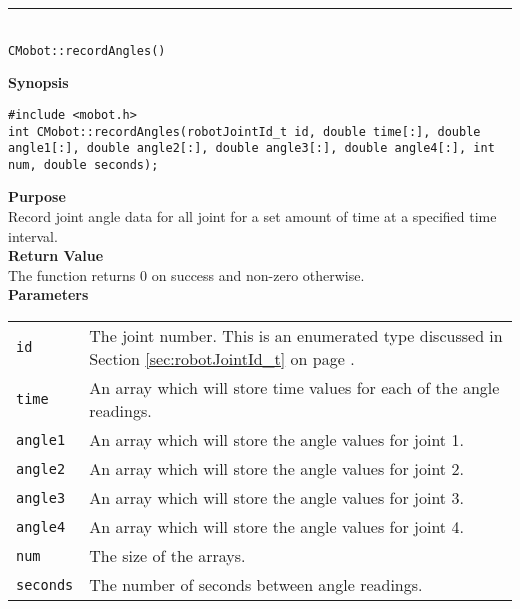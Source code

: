 \noindent
\vspace{5pt}
\rule{4.5in}{0.015in}\\
\noindent
{\LARGE \texttt{CMobot::recordAngles()}}\\
{}

\noindent
{\bf Synopsis}
\vspace{-8pt}
\begin{verbatim}
#include <mobot.h>
int CMobot::recordAngles(robotJointId_t id, double time[:], double angle1[:], double angle2[:], double angle3[:], double angle4[:], int num, double seconds);
\end{verbatim}

\noindent
{\bf Purpose}\\
Record joint angle data for all joint for a set amount of time at a specified time interval.\\

\noindent
{\bf Return Value}\\
The function returns 0 on success and non-zero otherwise.\\

\noindent
{\bf Parameters}\\
\vspace{-0.1in}
\begin{description}
\item               
\begin{tabular}{p{15 mm}p{145 mm}}
\texttt{id} & The joint number. This is an enumerated type 
discussed in Section \ref{sec:robotJointId_t} on page
\pageref{sec:robotJointId_t}.\\
\texttt{time} & An array which will store time values for each of the angle readings. \\
\texttt{angle1} & An array which will store the angle values for joint 1. \\
\texttt{angle2} & An array which will store the angle values for joint 2. \\
\texttt{angle3} & An array which will store the angle values for joint 3. \\
\texttt{angle4} & An array which will store the angle values for joint 4. \\
\texttt{num} & The size of the arrays. \\
\texttt{seconds} & The number of seconds between angle readings.
\end{tabular}
\end{description}

